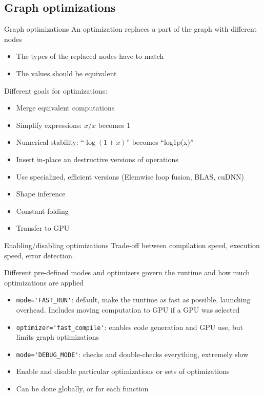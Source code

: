 \documentclass[a4paper,9pt]{beamer}
\begin{document}
\subsection{Graph optimizations}

\begin{frame}{Graph optimizations}
  An optimization replaces a part of the graph with different nodes
  \begin{itemize}
    \item The types of the replaced nodes have to match
    \item The values should be equivalent
  \end{itemize}
  Different goals for optimizations:
  \begin{itemize}
    \item Merge equivalent computations
    \item Simplify expressions: $x / x$ becomes $1$
    \item Numerical stability: ``$\log (1 + x)$'' becomes ``log1p(x)''
    \item Insert in-place an destructive versions of operations
    \item Use specialized, efficient versions (Elemwise loop fusion, BLAS, cuDNN)
    \item Shape inference
    \item Constant folding
    \item Transfer to GPU
  \end{itemize}
\end{frame}

\begin{frame}[fragile]{Enabling/disabling optimizations}
  Trade-off between compilation speed, execution speed, error detection.

  Different pre-defined modes and optimizers govern the runtime and how much optimizations are applied
  \begin{itemize}
    \item \verb|mode='FAST_RUN'|: default, make the runtime as fast as possible, launching overhead.
      Includes moving computation to GPU if a GPU was selected
    \item \verb|optimizer='fast_compile'|: enables code generation and GPU use, but limits graph optimizations
    \item \verb|mode='DEBUG_MODE'|: checks and double-checks everything, extremely slow
    \item Enable and disable particular optimizations or sets of optimizations
    \item Can be done globally, or for each function
  \end{itemize}

\end{frame}
\end{document}
